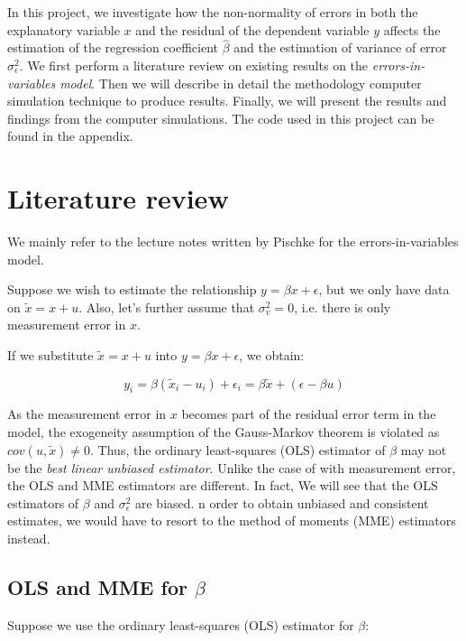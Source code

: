 \documentclass{article}
\begin{document}
In this project, we investigate how the non-normality of errors in both the explanatory variable $x$ and the residual of the dependent variable $y$ affects the estimation of the regression coefficient $\hat{\beta}$ and the estimation of variance of error $\sigma^2_\epsilon$.
We first perform a literature review on existing results on the \textit{errors-in-variables model}.
Then we will describe in detail the methodology computer simulation technique to produce results.
Finally, we will present the results and findings from the computer simulations.
The code used in this project can be found in the appendix.

\section{Literature review}

We mainly refer to the lecture notes written by Pischke \cite{lecturenotes} for the errors-in-variables model. 

Suppose we wish to estimate the relationship $y = \beta x + \epsilon$, but we only have data on $\tilde{x} = x + u$. Also, let's further assume that $\sigma_v^2 = 0$, i.e. there is only measurement error in $x$.

If we substitute $\tilde{x} = x+u$ into $y = \beta x + \epsilon$, we obtain:

\begin{equation}
    y_i = \beta(\tilde{x}_i - u_i) + \epsilon_i = \beta \tilde{x} + (\epsilon - \beta u)
\end{equation}

As the measurement error in $x$ becomes part of the residual error term in the model, the exogeneity assumption of the Gauss-Markov theorem is violated as $cov(u, \tilde{x}) \neq 0$.
Thus, the ordinary least-squares (OLS) estimator of $\beta$ may not be the \textit{best linear unbiased estimator}.
Unlike the case of with measurement error, the OLS and MME estimators are different.
In fact, We will see that the OLS estimators of $\beta$ and $\sigma_\epsilon^2$ are biased. 
n order to obtain unbiased and consistent estimates, we would have to resort to the method of moments (MME) estimators instead. 

\subsection{OLS and MME for $\beta$}

Suppose we use the ordinary least-squares (OLS) estimator for $\beta$:
\end{document}
